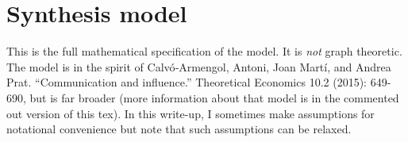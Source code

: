 \documentclass{article}
\begin{document}





\section{Synthesis model}
This is the full mathematical specification of the model.  It is
\emph{not} graph theoretic.    The model is in the
spirit of Calvó‐Armengol, Antoni, Joan Martí, and Andrea
Prat. ``Communication and influence.''  Theoretical Economics 10.2
(2015): 649-690, but is far broader (more information about that model
is in the commented out version of this tex).  In this write-up, I
sometimes make assumptions for notational convenience but note that
such assumptions can be relaxed.
\end{document}
